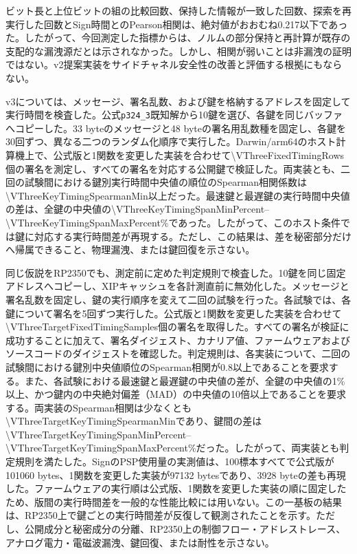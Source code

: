 \documentclass[a4paper,10pt]{ltjsarticle}
\theoremstyle{definition}
\theoremstyle{remark}
\begin{document}
ビット長と上位ビットの組の比較回数、保持した情報が一致した回数、探索を再実行した回数とSign時間とのPearson相関は、絶対値がおおむね\num{0.217}以下であった。したがって、今回測定した指標からは、ノルムの部分保持と再計算が既存の支配的な漏洩源だとは示されなかった。しかし、相関が弱いことは非漏洩の証明ではない。v2提案実装をサイドチャネル安全性の改善と評価する根拠にもならない。

v3については、メッセージ、署名乱数、および鍵を格納するアドレスを固定して実行時間を検査した。公式\texttt{p324\_3}既知解から10鍵を選び、各鍵を同じバッファへコピーした。33 byteのメッセージと48 byteの署名用乱数種を固定し、各鍵を30回ずつ、異なる二つのランダム化順序で実行した。Darwin/arm64のホスト計算機上で、公式版と1関数を変更した実装を合わせて\num{\VThreeFixedTimingRows}個の署名を測定し、すべての署名を対応する公開鍵で検証した。両実装とも、二回の試験間における鍵別実行時間中央値の順位のSpearman相関係数は\num{\VThreeKeyTimingSpearmanMin}以上だった。最速鍵と最遅鍵の実行時間中央値の差は、全鍵の中央値の\num{\VThreeKeyTimingSpanMinPercent}--\num{\VThreeKeyTimingSpanMaxPercent}\%であった。したがって、このホスト条件では鍵に対応する実行時間差が再現する。ただし、この結果は、差を秘密部分だけへ帰属できること、物理漏洩、または鍵回復を示さない。

同じ仮説をRP2350でも、測定前に定めた判定規則で検査した。10鍵を同じ固定アドレスへコピーし、XIPキャッシュを各計測直前に無効化した。メッセージと署名乱数を固定し、鍵の実行順序を変えて二回の試験を行った。各試験では、各鍵について署名を5回ずつ実行した。公式版と1関数を変更した実装を合わせて\num{\VThreeTargetFixedTimingSamples}個の署名を取得した。すべての署名が検証に成功することに加えて、署名ダイジェスト、カナリア値、ファームウェアおよびソースコードのダイジェストを確認した。判定規則は、各実装について、二回の試験間における鍵別中央値順位のSpearman相関が0.8以上であることを要求する。また、各試験における最速鍵と最遅鍵の中央値の差が、全鍵の中央値の1\%以上、かつ鍵内の中央絶対偏差（MAD）の中央値の10倍以上であることを要求する。両実装のSpearman相関は少なくとも\num{\VThreeTargetKeyTimingSpearmanMin}であり、鍵間の差は\num{\VThreeTargetKeyTimingSpanMinPercent}--\num{\VThreeTargetKeyTimingSpanMaxPercent}\%だった。したがって、両実装とも判定規則を満たした。SignのPSP使用量の実測値は、100標本すべてで公式版が\num{101060} bytes、1関数を変更した実装が\num{97132} bytesであり、\num{3928} byteの差も再現した。ファームウェアの実行順は公式版、1関数を変更した実装の順に固定したため、版間の実行時間差を一般的な性能比較には用いない。この一基板の結果は、RP2350上で鍵ごとの実行時間差が反復して観測されたことを示す。ただし、公開成分と秘密成分の分離、RP2350上の制御フロー・アドレストレース、アナログ電力・電磁波漏洩、鍵回復、または耐性を示さない。
\end{document}
